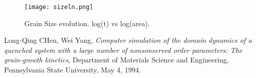 \documentclass{report}
\begin{document}
        \begin{figure}[!htb]
            \label{fig:domain-size}
            \centering
            \texttt{[image: sizeln.png]}
            \caption{Grain Size evolution. log(t) vs log(area).}
        \end{figure}


    \begin{thebibliography}{1}

      Long-Qing CHen, Wei Yang,
      \emph{Computer simulation of the domain dynamics of a quenched system with a large number of nonsonserved order parameters: The grain-growth kinetics},
      Department of Materials Science and Engineering, Pennsylvania State University,
      May 4, 1994.

    \end{thebibliography}
\end{document}
